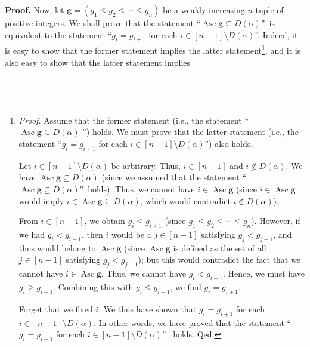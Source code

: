 \documentclass[numbers=enddot,12pt,final,onecolumn,notitlepage]{scrartcl}%
\theoremstyle{definition}
\newenvironment{proof}[1][Proof]{\noindent\textbf{#1.} }{\ \rule{0.5em}{0.5em}}
\newenvironment{verlong}{}{}
\begin{document}
\begin{verlong}
\begin{proof}
Now, let $\mathbf{g}=\left(  g_{1}\leq g_{2}\leq\cdots\leq g_{n}\right)  $ be
a weakly increasing $n$-tuple of positive integers. We shall prove that the
statement \textquotedblleft$\operatorname*{Asc}\mathbf{g}\subseteq D\left(
\alpha\right)  $\textquotedblright\ is equivalent to the statement
\textquotedblleft$g_{i}=g_{i+1}$ for each $i\in\left[  n-1\right]  \setminus
D\left(  \alpha\right)  $\textquotedblright. Indeed, it is easy to show that
the former statement implies the latter statement\footnote{\textit{Proof.}
Assume that the former statement (i.e., the statement \textquotedblleft%
$\operatorname*{Asc}\mathbf{g}\subseteq D\left(  \alpha\right)  $%
\textquotedblright) holds. We must prove that the latter statement (i.e., the
statement \textquotedblleft$g_{i}=g_{i+1}$ for each $i\in\left[  n-1\right]
\setminus D\left(  \alpha\right)  $\textquotedblright) also holds.
\par
Let $i\in\left[  n-1\right]  \setminus D\left(  \alpha\right)  $ be arbitrary.
Thus, $i\in\left[  n-1\right]  $ and $i\notin D\left(  \alpha\right)  $. We
have $\operatorname*{Asc}\mathbf{g}\subseteq D\left(  \alpha\right)  $ (since
we assumed that the statement \textquotedblleft$\operatorname*{Asc}%
\mathbf{g}\subseteq D\left(  \alpha\right)  $\textquotedblright\ holds). Thus,
we cannot have $i\in\operatorname*{Asc}\mathbf{g}$ (since $i\in
\operatorname*{Asc}\mathbf{g}$ would imply $i\in\operatorname*{Asc}%
\mathbf{g}\subseteq D\left(  \alpha\right)  $, which would contradict $i\notin
D\left(  \alpha\right)  $).
\par
From $i\in\left[  n-1\right]  $, we obtain $g_{i}\leq g_{i+1}$ (since
$g_{1}\leq g_{2}\leq\cdots\leq g_{n}$). However, if we had $g_{i}<g_{i+1}$,
then $i$ would be a $j\in\left[  n-1\right]  $ satisfying $g_{j}<g_{j+1}$, and
thus would belong to $\operatorname*{Asc}\mathbf{g}$ (since
$\operatorname*{Asc}\mathbf{g}$ is defined as the set of all $j\in\left[
n-1\right]  $ satisfying $g_{j}<g_{j+1}$); but this would contradict the fact
that we cannot have $i\in\operatorname*{Asc}\mathbf{g}$. Thus, we cannot have
$g_{i}<g_{i+1}$. Hence, we must have $g_{i}\geq g_{i+1}$. Combining this with
$g_{i}\leq g_{i+1}$, we find $g_{i}=g_{i+1}$.
\par
Forget that we fixed $i$. We thus have shown that $g_{i}=g_{i+1}$ for each
$i\in\left[  n-1\right]  \setminus D\left(  \alpha\right)  $. In other words,
we have proved that the statement \textquotedblleft$g_{i}=g_{i+1}$ for each
$i\in\left[  n-1\right]  \setminus D\left(  \alpha\right)  $\textquotedblright%
\ holds. Qed.}, and it is also easy to show that the latter statement implies

\end{proof}
\end{verlong}
\end{document}
